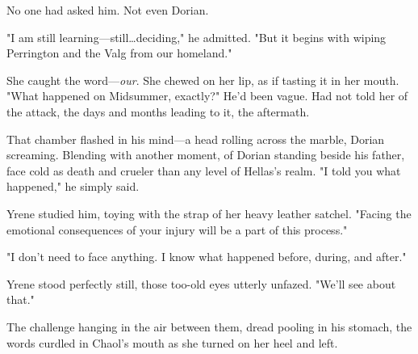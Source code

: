 No one had asked him.
Not even Dorian.

"I am still learning---still\ldots deciding," he admitted.
"But it begins with wiping Perrington and the Valg from our homeland."

She caught the word---\emph{our}.
She chewed on her lip, as if tasting it in her mouth.
"What happened on Midsummer, exactly?"
He'd been vague.
Had not told her of the attack, the days and months leading to it, the aftermath.

That chamber flashed in his mind---a head rolling across the marble, Dorian screaming.
Blending with another moment, of Dorian standing beside his father, face cold as death and crueler than any level of Hellas's realm.
"I told you what happened," he simply said.

Yrene studied him, toying with the strap of her heavy leather satchel.
"Facing the emotional consequences of your injury will be a part of this process."

"I don't need to face anything.
I know what happened before, during, and after."

Yrene stood perfectly still, those too-old eyes utterly unfazed.
"We'll see about that."

The challenge hanging in the air between them, dread pooling in his stomach, the words curdled in Chaol's mouth as she turned on her heel and left.


